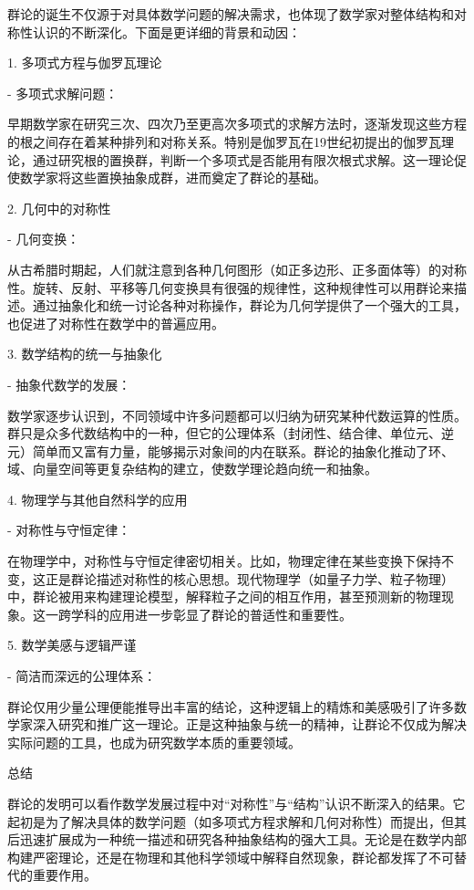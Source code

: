 \begin{note}[群的意义]

群论的诞生不仅源于对具体数学问题的解决需求，也体现了数学家对整体结构和对称性认识的不断深化。下面是更详细的背景和动因：

1. 多项式方程与伽罗瓦理论

- 多项式求解问题：

早期数学家在研究三次、四次乃至更高次多项式的求解方法时，逐渐发现这些方程的根之间存在着某种排列和对称关系。特别是伽罗瓦在19世纪初提出的伽罗瓦理论，通过研究根的置换群，判断一个多项式是否能用有限次根式求解。这一理论促使数学家将这些置换抽象成群，进而奠定了群论的基础。

2. 几何中的对称性

- 几何变换：

从古希腊时期起，人们就注意到各种几何图形（如正多边形、正多面体等）的对称性。旋转、反射、平移等几何变换具有很强的规律性，这种规律性可以用群论来描述。通过抽象化和统一讨论各种对称操作，群论为几何学提供了一个强大的工具，也促进了对称性在数学中的普遍应用。

3. 数学结构的统一与抽象化

- 抽象代数学的发展：

数学家逐步认识到，不同领域中许多问题都可以归纳为研究某种代数运算的性质。群只是众多代数结构中的一种，但它的公理体系（封闭性、结合律、单位元、逆元）简单而又富有力量，能够揭示对象间的内在联系。群论的抽象化推动了环、域、向量空间等更复杂结构的建立，使数学理论趋向统一和抽象。

4. 物理学与其他自然科学的应用

- 对称性与守恒定律：

在物理学中，对称性与守恒定律密切相关。比如，物理定律在某些变换下保持不变，这正是群论描述对称性的核心思想。现代物理学（如量子力学、粒子物理）中，群论被用来构建理论模型，解释粒子之间的相互作用，甚至预测新的物理现象。这一跨学科的应用进一步彰显了群论的普适性和重要性。

5. 数学美感与逻辑严谨

- 简洁而深远的公理体系：

群论仅用少量公理便能推导出丰富的结论，这种逻辑上的精炼和美感吸引了许多数学家深入研究和推广这一理论。正是这种抽象与统一的精神，让群论不仅成为解决实际问题的工具，也成为研究数学本质的重要领域。

总结

群论的发明可以看作数学发展过程中对“对称性”与“结构”认识不断深入的结果。它起初是为了解决具体的数学问题（如多项式方程求解和几何对称性）而提出，但其后迅速扩展成为一种统一描述和研究各种抽象结构的强大工具。无论是在数学内部构建严密理论，还是在物理和其他科学领域中解释自然现象，群论都发挥了不可替代的重要作用。

\end{note}

